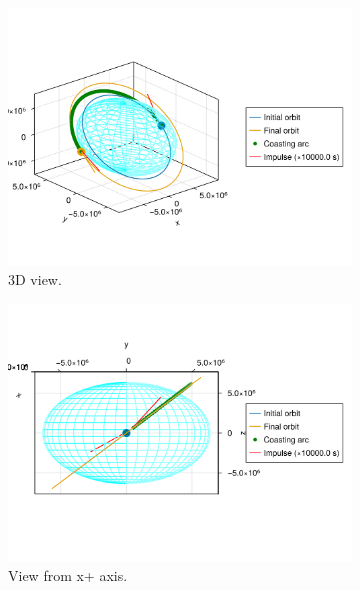 \begin{figure}[htbp]
    \centering
    \begin{subfigure}{0.49\linewidth}
        \includegraphics[width=\linewidth]{../results/j2/hohmann/CICIC_3d.png}
        \caption{3D view.}
    \end{subfigure}
    \begin{subfigure}{0.49\linewidth}
        \includegraphics[width=\linewidth]{../results/j2/hohmann/CICIC_x+.png}
        \caption{View from x+ axis.}
    \end{subfigure}
    \begin{subfigure}{0.49\linewidth}

\end{subfigure}
\end{figure}
